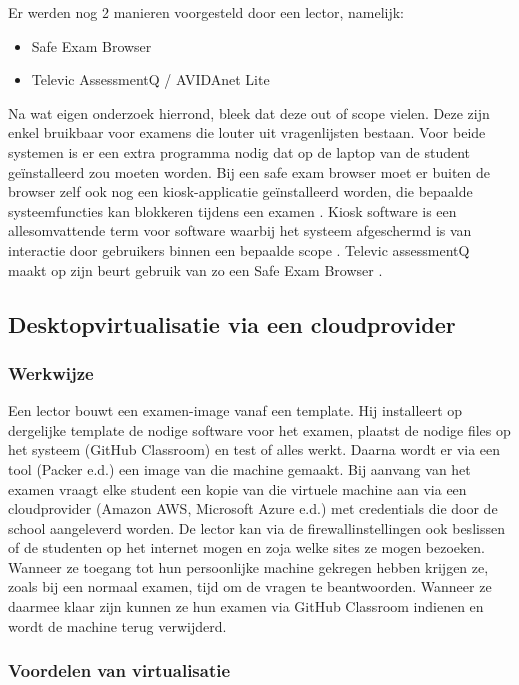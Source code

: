 Er werden nog 2 manieren voorgesteld door een lector, namelijk:  
\begin{itemize}
	\item Safe Exam Browser 
	\item Televic AssessmentQ / AVIDAnet Lite
\end{itemize}

Na wat eigen onderzoek hierrond, bleek dat deze out of scope vielen. Deze zijn enkel bruikbaar voor examens die louter uit vragenlijsten bestaan. Voor beide systemen is er een extra programma nodig dat op de laptop van de student ge\"{i}nstalleerd zou moeten worden. Bij een safe exam browser moet er buiten de browser zelf ook nog een kiosk-applicatie ge\"{i}nstalleerd worden, die bepaalde systeemfuncties kan blokkeren tijdens een examen \autocite{SEB2019}. Kiosk software is een allesomvattende term voor software waarbij het systeem afgeschermd is van interactie door gebruikers binnen een bepaalde scope \autocite{Kio2009}. Televic assessmentQ maakt op zijn beurt gebruik van zo een Safe Exam Browser \autocite{Tele2019}. 

\subsection{Desktopvirtualisatie via een cloudprovider}

\subsubsection{Werkwijze}
Een lector bouwt een examen-image vanaf een template. Hij installeert op dergelijke template de nodige software voor het examen, plaatst de nodige files op het systeem (GitHub Classroom) en test of alles werkt.  Daarna wordt er via een tool (Packer e.d.) een image van die machine gemaakt.  Bij aanvang van het examen vraagt elke student een kopie van die virtuele machine aan via een cloudprovider (Amazon AWS, Microsoft Azure e.d.) met credentials die door de school aangeleverd worden. De lector kan via de firewallinstellingen ook beslissen of de studenten op het internet mogen en zoja welke sites ze mogen bezoeken. Wanneer ze toegang tot hun persoonlijke machine gekregen hebben krijgen ze, zoals bij een normaal examen, tijd om de vragen te beantwoorden. Wanneer ze daarmee klaar zijn kunnen ze hun examen via GitHub Classroom indienen en wordt de machine terug verwijderd. 

\subsubsection{Voordelen van virtualisatie}

